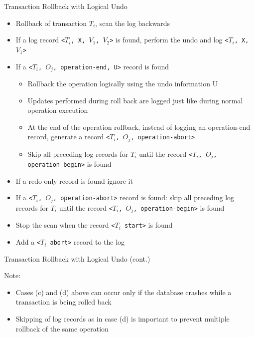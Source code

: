 \documentclass[aspectratio=169, xcolor=dvipsnames]{beamer}
\begin{document}
\begin{frame}{Transaction Rollback with Logical Undo}
    \begin{itemize}[<+->]
        \item Rollback of transaction $T_i$, scan the log backwards
        \item[a)] If a log record \texttt{<$T_i$, X, $V_1$, $V_2$>} is found, perform the undo and log \texttt{<$T_i$, X, $V_1$>}
        \item[b)] If a \texttt{<$T_i$, $O_j$, operation-end, U>} record is found
        \begin{itemize}
            \item[$\triangleright$] Rollback the operation logically using the undo information U
            \item[$\triangleright$] Updates performed during roll back are logged just like during normal operation execution
            \item[$\triangleright$] At the end of the operation rollback, instead of logging an operation-end record, generate a record \texttt{<$T_i$, $O_j$, operation-abort>}
            \item[$\triangleright$] Skip all preceding log records for $T_i$ until the record \texttt{<$T_i$, $O_j$, operation-begin>} is found
        \end{itemize}
        \item[c)] If a redo-only record is found ignore it
        \item[d)] If a \texttt{<$T_i$, $O_j$, operation-abort>} record is found: skip all preceding log records for $T_i$ until the record \texttt{<$T_i$, $O_j$, operation-begin>} is found
        \item[e)] Stop the scan when the record \texttt{<$T_i$ start>} is found
        \item[f)] Add a \texttt{<$T_i$ abort>} record to the log
    \end{itemize}
\end{frame}

\begin{frame}{Transaction Rollback with Logical Undo (cont.)}
    \begin{block}{Note:}
        \begin{itemize}
            \item Cases (c) and (d) above can occur only if the database crashes while a transaction is being rolled back
            \item Skipping of log records as in case (d) is important to prevent multiple rollback of the same operation
        \end{itemize}
    \end{block}
\end{frame}
\end{document}
